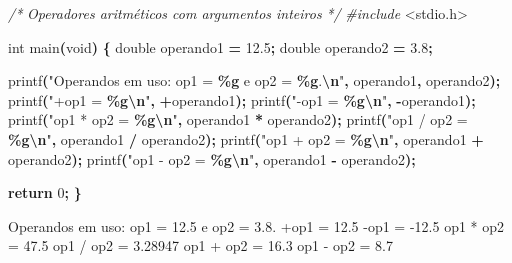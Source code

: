 \documentclass[
  11pt,
  a4paper,
]{scrbook}
\newenvironment{Shaded}{\begin{snugshade}}{\end{snugshade}}
\newcommand{\CommentTok}[1]{\textcolor[rgb]{0.56,0.35,0.01}{\textit{#1}}}
\newcommand{\ControlFlowTok}[1]{\textcolor[rgb]{0.13,0.29,0.53}{\textbf{#1}}}
\newcommand{\DataTypeTok}[1]{\textcolor[rgb]{0.13,0.29,0.53}{#1}}
\newcommand{\DecValTok}[1]{\textcolor[rgb]{0.00,0.00,0.81}{#1}}
\newcommand{\FloatTok}[1]{\textcolor[rgb]{0.00,0.00,0.81}{#1}}
\newcommand{\ImportTok}[1]{#1}
\newcommand{\NormalTok}[1]{#1}
\newcommand{\OperatorTok}[1]{\textcolor[rgb]{0.81,0.36,0.00}{\textbf{#1}}}
\newcommand{\PreprocessorTok}[1]{\textcolor[rgb]{0.56,0.35,0.01}{\textit{#1}}}
\newcommand{\SpecialCharTok}[1]{\textcolor[rgb]{0.81,0.36,0.00}{\textbf{#1}}}
\newcommand{\StringTok}[1]{\textcolor[rgb]{0.31,0.60,0.02}{#1}}
\begin{document}
\begin{Shaded}
\begin{Highlighting}[]
\CommentTok{/*}
\CommentTok{Operadores aritméticos com argumentos inteiros}
\CommentTok{*/}
\PreprocessorTok{\#include }\ImportTok{\textless{}stdio.h\textgreater{}}

\DataTypeTok{int}\NormalTok{ main}\OperatorTok{(}\DataTypeTok{void}\OperatorTok{)} \OperatorTok{\{}
    \DataTypeTok{double}\NormalTok{ operando1 }\OperatorTok{=} \FloatTok{12.5}\OperatorTok{;}
    \DataTypeTok{double}\NormalTok{ operando2 }\OperatorTok{=} \FloatTok{3.8}\OperatorTok{;}

\NormalTok{    printf}\OperatorTok{(}\StringTok{"Operandos em uso: op1 = }\SpecialCharTok{\%g}\StringTok{ e op2 = }\SpecialCharTok{\%g}\StringTok{.}\SpecialCharTok{\textbackslash{}n}\StringTok{"}\OperatorTok{,}\NormalTok{ operando1}\OperatorTok{,}\NormalTok{ operando2}\OperatorTok{);}
\NormalTok{    printf}\OperatorTok{(}\StringTok{"+op1 = }\SpecialCharTok{\%g\textbackslash{}n}\StringTok{"}\OperatorTok{,} \OperatorTok{+}\NormalTok{operando1}\OperatorTok{);}
\NormalTok{    printf}\OperatorTok{(}\StringTok{"{-}op1 = }\SpecialCharTok{\%g\textbackslash{}n}\StringTok{"}\OperatorTok{,} \OperatorTok{{-}}\NormalTok{operando1}\OperatorTok{);}
\NormalTok{    printf}\OperatorTok{(}\StringTok{"op1 * op2 = }\SpecialCharTok{\%g\textbackslash{}n}\StringTok{"}\OperatorTok{,}\NormalTok{ operando1 }\OperatorTok{*}\NormalTok{ operando2}\OperatorTok{);}
\NormalTok{    printf}\OperatorTok{(}\StringTok{"op1 / op2 = }\SpecialCharTok{\%g\textbackslash{}n}\StringTok{"}\OperatorTok{,}\NormalTok{ operando1 }\OperatorTok{/}\NormalTok{ operando2}\OperatorTok{);}
\NormalTok{    printf}\OperatorTok{(}\StringTok{"op1 + op2 = }\SpecialCharTok{\%g\textbackslash{}n}\StringTok{"}\OperatorTok{,}\NormalTok{ operando1 }\OperatorTok{+}\NormalTok{ operando2}\OperatorTok{);}
\NormalTok{    printf}\OperatorTok{(}\StringTok{"op1 {-} op2 = }\SpecialCharTok{\%g\textbackslash{}n}\StringTok{"}\OperatorTok{,}\NormalTok{ operando1 }\OperatorTok{{-}}\NormalTok{ operando2}\OperatorTok{);}

    \ControlFlowTok{return} \DecValTok{0}\OperatorTok{;}
\OperatorTok{\}}
\end{Highlighting}
\end{Shaded}

\begin{Shaded}
\begin{Highlighting}[]
\NormalTok{Operandos em uso: op1 = 12.5 e op2 = 3.8.}
\NormalTok{+op1 = 12.5}
\NormalTok{{-}op1 = {-}12.5}
\NormalTok{op1 * op2 = 47.5}
\NormalTok{op1 / op2 = 3.28947}
\NormalTok{op1 + op2 = 16.3}
\NormalTok{op1 {-} op2 = 8.7}
\end{Highlighting}
\end{Shaded}
\end{document}
